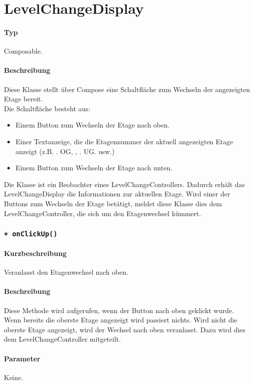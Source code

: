 \section{LevelChangeDisplay}
\paragraph*{Typ}
Composable.
\paragraph*{Beschreibung}
Diese Klasse stellt über Compose eine Schaltfläche zum Wechseln der angezeigten Etage bereit.\\
Die Schaltfläche besteht aus:
\begin{itemize}
    \item Einem Button zum Wechseln der Etage nach oben.
    \item Einer Textanzeige, die die Etagennummer der aktuell angezeigten Etage anzeigt 
    (z.B. . OG\dq, \dqEG\dq, . UG\dq. usw.)
    \item Einem Button zum Wechseln der Etage nach unten.
\end{itemize}
Die Klasse ist ein Beobachter eines LevelChangeControllers. Dadurch erhält das 
LevelChangeDisplay die Informationen zur aktuellen Etage. Wird einer der Buttons zum 
Wechseln der Etage betätigt, meldet diese Klasse dies dem LevelChangeController, 
die sich um den Etagenwechsel kümmert.

\subsubsection{\texttt{+ onClickUp()}}%
\paragraph*{Kurzbeschreibung}
Veranlasst den Etagenwechsel nach oben.
\paragraph*{Beschreibung}
Diese Methode wird aufgerufen, wenn der Button nach oben geklickt wurde. \\
Wenn bereits die oberste Etage angezeigt wird passiert nichts. 
Wird nicht die oberste Etage angezeigt, wird der Wechsel nach oben veranlasst.
Dazu wird dies dem LevelChangeController mitgeteilt.
\paragraph*{Parameter}
Keine.
